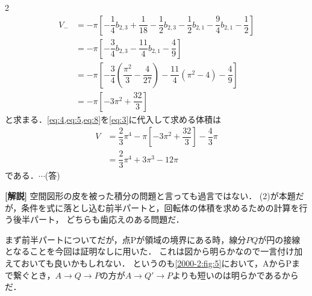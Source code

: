 \documentclass[../../main.tex]{subfiles}
\begin{document}
\begin{multicols}{2}
\begin{align}
    V_{-}
    & = -\pi \left[ -\dfrac{1}{4}b_{2,3}+\dfrac{1}{18} - \dfrac{1}{2}b_{2,3} -\dfrac{1}{2}b_{2,1}-\dfrac{9}{4}b_{2,1}-\dfrac{1}{2} \right] \nonumber           \\
    & = -\pi \left[ -\dfrac{3}{4}b_{2,3} -\dfrac{11}{4}b_{2,1}-\dfrac{4}{9} \right]                                                     \nonumber           \\
    & = -\pi \left[ -\dfrac{3}{4}\left( \dfrac{\pi^2}{3} - \dfrac{4}{27}\right) -\dfrac{11}{4}\left(\pi^2-4\right)-\dfrac{4}{9} \right]   \nonumber           \\
    & = -\pi \left[ -3\pi^2 + \dfrac{32}{3}  \right]                                                                                  \label{eq:8}
  \end{align}
  と求まる．\cref{eq:4,eq:5,eq:8}を\cref{eq:3}に代入して求める体積は
  \begin{align}
    V
    & = \dfrac{2}{3}\pi^4 -\pi \left[ -3\pi^2 + \dfrac{32}{3}  \right] - \dfrac{4}{3}\pi \\
    & = \dfrac{2}{3}\pi^4 + 3\pi^3 -12 \pi
  \end{align}
  である．$\cdots$(答)

  {\bf [解説]}
  空間図形の皮を被った積分の問題と言っても過言ではない．
  (2)が本題だが，条件を式に落とし込む前半パートと，回転体の体積を求めるための計算を行う後半パート，
  どちらも歯応えのある問題だ．

  まず前半パートについてだが，点Pが領域の境界にある時，線分$PQ$が円の接線となることを今回は証明なしに用いた．
  これは図から明らかなので一言付け加えておいても良いかもしれない．
  というのも\cref{2000-2:fig:5}において，AからPまで繋ぐとき，$A\to Q\to P$の方が$A\to Q' \to P$よりも短いのは明らかであるからだ．

  \begin{figure}[H]
    \centering
\end{figure}
\end{multicols}
\end{document}
